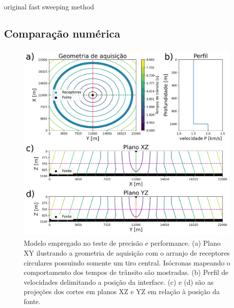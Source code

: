 original fast sweeping method

\cite{zhao2005fast}

\cite{zhao2007parallel}

\cite{detrixhe2013parallel}

\cite{noble2014accurate}


\subsection*{Comparação numérica}


\begin{figure}[H]
	\centering
	\includegraphics[width = 11cm, height = 10cm]{Imgs/RevisaoBibliografica/modelGeometry.png}
	\caption{Modelo empregado no teste de precisão e performance. (a) Plano XY ilustrando a geometria de aquisição com o arranjo de receptores circulares possuindo somente um tiro central. Isócronas mapeando o comportamento dos tempos de trânsito são mostradas. (b) Perfil de velocidades delimitando a posição da interface. (c) e (d) são as projeções dos cortes em planos XZ e YZ em relação à posição da fonte.}
	\label{fig:configurationNumericalComparison}
\end{figure}


